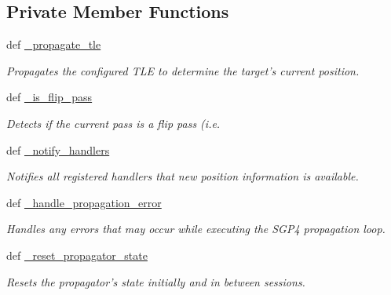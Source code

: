 \subsection*{Private Member Functions}
\begin{DoxyCompactItemize}
\item 
def \hyperlink{classhwm_1_1hardware_1_1devices_1_1drivers_1_1sgp4__tracker_1_1sgp4__tracker_1_1_s_g_p4_propagation_service_afcfffeb568845a241cc0b89c032289e4}{\-\_\-propagate\-\_\-tle}
\begin{DoxyCompactList}\small\item\em Propagates the configured T\-L\-E to determine the target's current position. \end{DoxyCompactList}\item 
def \hyperlink{classhwm_1_1hardware_1_1devices_1_1drivers_1_1sgp4__tracker_1_1sgp4__tracker_1_1_s_g_p4_propagation_service_aed19e238a58dfced328c3cdd961387c1}{\-\_\-is\-\_\-flip\-\_\-pass}
\begin{DoxyCompactList}\small\item\em Detects if the current pass is a flip pass (i.\-e. \end{DoxyCompactList}\item 
def \hyperlink{classhwm_1_1hardware_1_1devices_1_1drivers_1_1sgp4__tracker_1_1sgp4__tracker_1_1_s_g_p4_propagation_service_aad212a39d618326af260e1b97fad6d93}{\-\_\-notify\-\_\-handlers}
\begin{DoxyCompactList}\small\item\em Notifies all registered handlers that new position information is available. \end{DoxyCompactList}\item 
def \hyperlink{classhwm_1_1hardware_1_1devices_1_1drivers_1_1sgp4__tracker_1_1sgp4__tracker_1_1_s_g_p4_propagation_service_ab87cddee9fc99bb1e3cf59986b13716e}{\-\_\-handle\-\_\-propagation\-\_\-error}
\begin{DoxyCompactList}\small\item\em Handles any errors that may occur while executing the S\-G\-P4 propagation loop. \end{DoxyCompactList}\item 
def \hyperlink{classhwm_1_1hardware_1_1devices_1_1drivers_1_1sgp4__tracker_1_1sgp4__tracker_1_1_s_g_p4_propagation_service_a63bbc3f61c575abaf94d6c3bf1001432}{\-\_\-reset\-\_\-propagator\-\_\-state}
\begin{DoxyCompactList}\small\item\em Resets the propagator's state initially and in between sessions. \end{DoxyCompactList}\end{DoxyCompactItemize}
